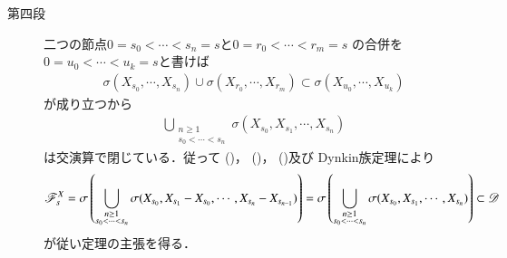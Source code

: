 \begin{prf}[Problem 1.4]
\begin{description}
		\item[第四段]
			二つの節点$0 = s_0 < \cdots < s_n = s$と$0 = r_0 < \cdots < r_m = s$
			の合併を$0 = u_0 < \cdots < u_k = s$と書けば
			\begin{align}
				\sigma(X_{s_0},\cdots,X_{s_n})
				\cup \sigma(X_{r_0},\cdots,X_{r_m})
				\subset \sigma(X_{u_0},\cdots,X_{u_k})
			\end{align}
			が成り立つから
			\begin{align}
				\bigcup_{\substack{n \geq 1 \\ s_0 < \cdots < s_n}} \sigma(X_{s_0},X_{s_1},\cdots,X_{s_n})
			\end{align}
			は交演算で閉じている．従って
			()，
			()，
			()及び
			Dynkin族定理により
			\begin{align}
				\mathscr{F}^X_s 
				= \sigma \left(\bigcup_{\substack{n \geq 1 \\ s_0 < \cdots < s_n}} \sigma(X_{s_0},X_{s_1}-X_{s_0},\cdots,X_{s_n} - X_{s_{n-1}})\right)
				= \sigma \left(\bigcup_{\substack{n \geq 1 \\ s_0 < \cdots < s_n}} \sigma(X_{s_0},X_{s_1},\cdots,X_{s_n})\right)
				\subset \mathscr{D}
			\end{align}
			が従い定理の主張を得る．
			\QED
	\end{description}
\end{prf}